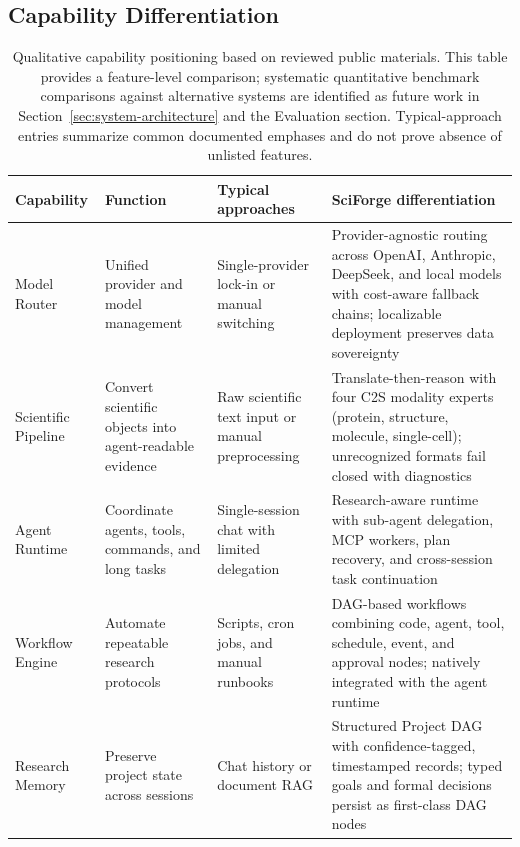 \documentclass[sn-basic,Numbered,pdflatex]{sn-jnl}
\begin{document}
\clearpage
\begin{appendices}
\renewcommand{\theHtable}{A.\arabic{table}}

\section{Capability Differentiation}

\begin{table}[ht!]
\caption{Qualitative capability positioning based on reviewed public materials. This table provides a feature-level comparison; systematic quantitative benchmark comparisons against alternative systems are identified as future work in Section~\ref{sec:system-architecture} and the Evaluation section. Typical-approach entries summarize common documented emphases and do not prove absence of unlisted features.}
\label{tab:capability_differentiation}
\scriptsize
\centering
\setlength{\tabcolsep}{2.5pt}
\renewcommand{\arraystretch}{1.08}
\begin{tabular}{@{}L{2.0cm} L{2.4cm} L{2.8cm} L{3.1cm}@{}}
\toprule
\textbf{Capability} & \textbf{Function} & \textbf{Typical approaches} & \textbf{SciForge differentiation} \\
\midrule
Model Router
& Unified provider and model management
& Single-provider lock-in or manual switching
& Provider-agnostic routing across OpenAI, Anthropic, DeepSeek, and local models with cost-aware fallback chains; localizable deployment preserves data sovereignty \\
Scientific Pipeline
& Convert scientific objects into agent-readable evidence
& Raw scientific text input or manual preprocessing
& Translate-then-reason with four C2S modality experts (protein, structure, molecule, single-cell); unrecognized formats fail closed with diagnostics \\
Agent Runtime
& Coordinate agents, tools, commands, and long tasks
& Single-session chat with limited delegation
& Research-aware runtime with sub-agent delegation, MCP workers, plan recovery, and cross-session task continuation \\
Workflow Engine
& Automate repeatable research protocols
& Scripts, cron jobs, and manual runbooks
& DAG-based workflows combining code, agent, tool, schedule, event, and approval nodes; natively integrated with the agent runtime \\
Research Memory
& Preserve project state across sessions
& Chat history or document RAG
& Structured Project DAG with confidence-tagged, timestamped records; typed goals and formal decisions persist as first-class DAG nodes \\

\end{tabular}
\end{table}
\end{appendices}
\end{document}
